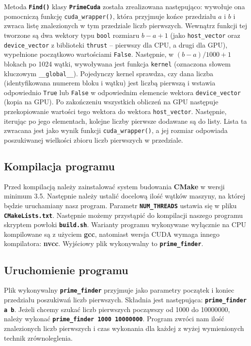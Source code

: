 \documentclass[12pt, twoside, hidelinks, a4paper]{article}
\begin{document}
Metoda \textbf{\texttt{Find()}} klasy \textbf{\texttt{PrimeCuda}} została zrealizowana następująco: wywołuje ona pomocniczą funkcję \texttt{cuda\_wrapper()}, która przyjmuje końce przedziału $a$ i $b$ i zwraca listę znalezionych w tym przedziale liczb pierwszych. Wewnątrz funkcji tej tworzone są dwa wektory typu \texttt{bool} rozmiaru $b-a+1$ (jako \texttt{host\_vector} oraz \texttt{device\_vector} z biblioteki \texttt{thrust} -- pierwszy dla CPU, a drugi dla GPU), wypełnione początkowo wartościami \texttt{False}. Następnie, w $(b-a)/1000+1$ blokach po 1024 wątki, wywoływana jest funkcja \texttt{kernel} (oznaczona słowem kluczowym \texttt{\_\_global\_\_}). Pojedynczy kernel sprawdza, czy dana liczba (identyfikowana numerem bloku i wątku) jest liczbą pierwszą i wstawia odpowiednio \texttt{True} lub \texttt{False} w odpowiednim elemencie wektora \texttt{device\_vector} (kopia na GPU). Po zakończeniu wszystkich obliczeń na GPU następuje przekopiowanie wartości tego wektora do wektora \texttt{host\_vector}. Następnie, iterując po jego elementach, kolejne liczby pierwsze dodawane są do listy. Lista ta zwracana jest jako wynik funkcji \texttt{cuda\_wrapper()}, a jej rozmiar odpowiada poszukiwanej wielkości zbioru liczb pierwszych w przedziale.

\subsection{Kompilacja programu}
Przed kompilacją należy zainstalować system budowania \textbf{CMake} w wersji minimum 3.5. Następnie należy ustalić docelową ilość wątków maszyny, na której będzie uruchamiany nasz program. Parametr \textbf{\texttt{NUM\_THREADS}} ustawia się w pliku \textbf{\texttt{CMakeLists.txt}}. Następnie możemy przystąpić do kompilacji naszego programu skryptem powłoki \textbf{\texttt{build.sh}}. Warianty programu wykonywane wyłącznie na CPU kompilowane są z użyciem \textbf{gcc}, natomiast wersja CUDA wymaga innego kompilatora: \textbf{nvcc}. Wyjściowy plik wykonywalny to \textbf{\texttt{prime\_finder}}.

\subsection{Uruchomienie programu}
Plik wykonywalny \textbf{\texttt{prime\_finder}} przyjmuje jako parametry początek i koniec przedziału poszukiwań liczb pierwszych. Składnia jest następująca: \textbf{\texttt{prime\_finder a b}}. Jeżeli chcemy szukać liczb pierwszych począwszy od 1000 do 10000000, należy wykonać \textbf{\texttt{prime\_finder 1000 10000000}}. Program zwróci nam ilość znalezionych liczb pierwszych i czas wykonania dla każdej z wyżej wymienionych technik zrównoleglenia.
\end{document}
